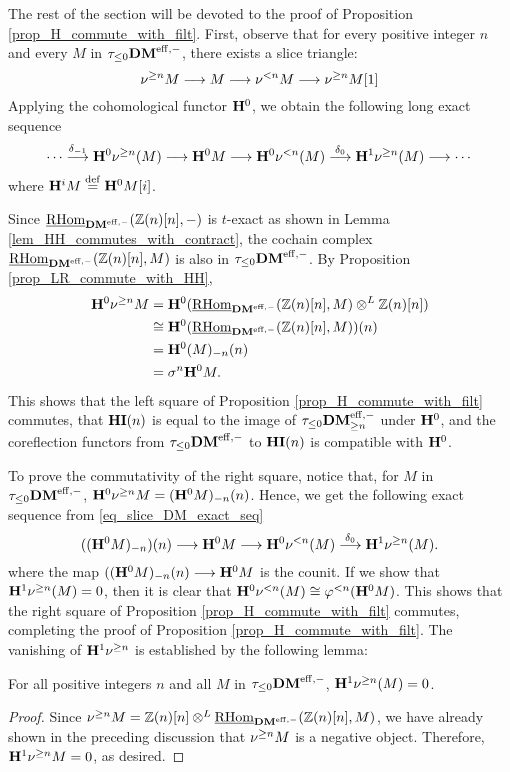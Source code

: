 The rest of the section will be devoted to the proof of
Proposition \ref{prop_H_commute_with_filt}. 
First, observe that for every positive integer $n$ and every $M$ 
in $\tau_{\leq 0}\DMeff$, there exists a slice triangle:
\[
\sliceTriangle{n}{M}
\]
Applying the cohomological functor $\HH^0$, we obtain the
following long exact sequence
\begin{equation}\label{eq_slice_DM_exact_seq}
\cdots \stackrel{\delta_{-1}}{\to} \HH^0 \sgDM{n}(M) \to 
   \HH^0 M \to \HH^0 \slDM{n}(M)
   \stackrel{\delta_0}{\to} \HH^1 \sgDM{n}(M) \to \cdots
\end{equation}
where $\HH^i M \defeq \HH^0M[i]$. 

Since $\ihomDMf(\Z(n)[n], -)$ is $t$-exact as shown in Lemma 
\ref{lem_HH_commutes_with_contract}, the cochain complex $\ihomDMf(\Z(n)[n], M)$
is also in $\tau_{\leq 0}\DMeff$. By Proposition \ref{prop_LR_commute_with_HH},
\begin{align*}
\HH^0 \sgDM{n}M &= \HH^0 (\ihomDMf(\Z(n)[n], M) \tDM \Z(n)[n]) \\
&\cong \LHI[n]{\HH^0(\ihomDMf(\Z(n)[n], M))} \\
&= \LHI[n]{\RHI[n]{\HH^0(M)}} \\
&= \sgHI{n}\HH^0M.
\end{align*}
This shows that the left square of Proposition 
\ref{prop_H_commute_with_filt} commutes, that $\HI(n)$ is equal to 
the image of $\tau_{\leq 0}\GFiltDM[n]{\DMeff}$ under $\HH^0$, and the 
coreflection functors from $\tau_{\leq 0}\DMeff$ to $\HI(n)$ is compatible with
$\HH^0$.

To prove the commutativity of the right square,
notice that, for $M$ in $\tau_{\leq 0}\DMeff$, 
$\HH^0\sgDM{n}M = \LHI[n]{\RHI[n]{(\HH^{0}M)}}$. Hence, we get 
the following exact sequence from \eqref{eq_slice_DM_exact_seq}
\[
\LHI[n]{(\RHI[n]{(\HH^0M)})} \to \HH^0M \to \HH^0{\slDM{n}(M)} 
   \stackrel{\delta_0}{\to} \HH^1 \sgDM{n}(M).
\]
where the map $\LHI[n]{(\RHI[n]{(\HH^0M)}} \to \HH^0M$ is the counit. If we show
that $\HH^1 \sgDM{n}(M) = 0$, then it is clear that $\HH^0 \slDM{n}(M)
\cong \tlHI{n}(\HH^0M)$. This shows that the right square of Proposition
\ref{prop_H_commute_with_filt} commutes, completing the proof of
Proposition \ref{prop_H_commute_with_filt}. The vanishing of 
$\HH^1\sgDM{n}$ is established by the following lemma:

\begin{lem}\label{lem_Hsg_vanishes}
For all positive integers $n$ and all $M$ in $\tau_{\leq 0}\DMeff$, $\HH^1 
\sgDM{n}(M) = 0$.
\end{lem}
\begin{proof}
Since $\sgDM{n} M = \Z(n)[n] \tDM \ihomDMf(\Z(n)[n], M)$, we have 
already shown in the preceding discussion that $\sgDM{n} M$
is a negative object. Therefore, $\HH^1 \sgDM{n} M = 0$, as desired.
\end{proof}

